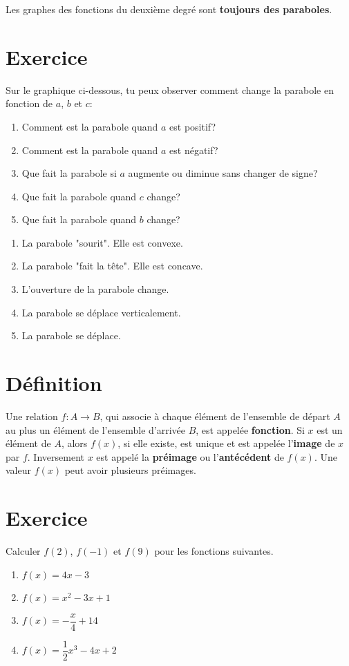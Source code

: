 \documentclass[a4paper,11pt]{article}
\begin{document}
Les graphes des fonctions du deuxième degré sont \textbf{toujours des paraboles}.

\section{Exercice}
Sur le graphique ci-dessous, tu peux observer comment change la parabole en fonction de $a$, $b$ et $c$:\par
{}
\begin{enumerate}
    \item Comment est la parabole quand $a$ est positif?
    \item Comment est la parabole quand $a$ est négatif?
    \item Que fait la parabole si $a$ augmente ou diminue sans changer de signe?
    \item Que fait la parabole quand $c$ change?
    \item Que fait la parabole quand $b$ change?
\end{enumerate}

\begin{solution}
\begin{enumerate}
    \item La parabole "sourit". Elle est convexe.
    \item La parabole "fait la tête". Elle est concave.
    \item L'ouverture de la parabole change.
    \item La parabole se déplace verticalement.
    \item La parabole se déplace.
\end{enumerate}
\end{solution}

\section{Définition}
Une relation $f: A \longrightarrow B$, qui associe à chaque élément de l'ensemble de départ $A$ au plus un élément de l'ensemble d'arrivée $B$, est appelée \textbf{fonction}.
Si $x$ est un élément de $A$, alors $f(x)$, si elle existe, est unique et est appelée l'\textbf{image} de $x$ par $f$.
Inversement $x$ est appelé la \textbf{préimage} ou l'\textbf{antécédent} de $f(x)$.
Une valeur $f(x)$ peut avoir plusieurs préimages.

\section{Exercice}
Calculer $f(2)$, $f(-1)$ et $f(9)$ pour les fonctions suivantes.
\begin{multicols}{2}
\begin{enumerate}
\item $f(x)=4x-3$
\item $f(x)=x^2-3x+1$
\item $f(x)=-\dfrac{x}{4}+14$
\item $f(x)=\dfrac{1}{2}x^3-4x+2$
\end{enumerate}
\end{multicols}
\end{document}
